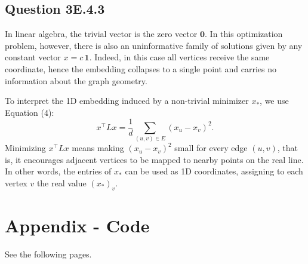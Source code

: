 \documentclass[a4paper]{scrartcl}
\begin{document}
\subsection*{Question 3E.4.3}
In linear algebra, the trivial vector is the zero vector $\mathbf{0}$. In this optimization problem, however, there is also an uninformative family of solutions given by any constant vector $x=c\,\mathbf{1}$. Indeed, in this case all vertices receive the same coordinate, hence the embedding collapses to a single point and carries no information about the graph geometry.

To interpret the 1D embedding induced by a non-trivial minimizer $x_*$, we use Equation (4):
\[
x^{\top} L x=\frac{1}{d}\sum_{(u,v)\in E}(x_u-x_v)^2.
\]
Minimizing $x^{\top} L x$ means making $(x_u-x_v)^2$ small for every edge $(u,v)$, that is, it encourages adjacent vertices to be mapped to nearby points on the real line. In other words, the entries of $x_*$ can be used as 1D coordinates, assigning to each vertex $v$ the real value $(x_*)_v$.
\section*{Appendix - Code}
See the following pages.
\end{document}
